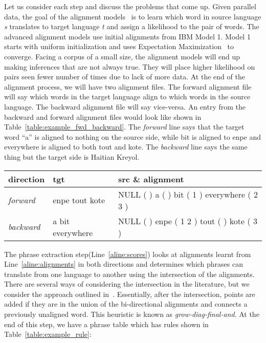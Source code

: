 Let us consider each step and discuss the problems that come up. Given parallel data, the goal of the alignment models~\cite{Brown:1993,Vogel:1996} is to learn which word in source language \emph{s} translates to target language \emph{t} and assign a likelihood to the pair of words. The advanced alignment models use initial alignments from IBM Model 1. Model 1 starts with uniform initialization and uses Expectation Maximization~\cite{Dempster:77} to converge. Facing a corpus of a small size, the alignment models will end up making inferences that are not always true. They will place higher likelihood on pairs seen fewer number of times due to lack of more data. At the end of the alignment process, we will have two alignment files. The forward alignment file will say which words in the target language align to which words in the source language. The backward alignment file will say vice-versa. An entry from the backward and forward alignment files would look like shown in Table~\ref{table:example_fwd_backward}. The \emph{forward} line says that the target word ``a'' is aligned to nothing on the source side, while bit is aligned to enpe and everywhere is aligned to both tout and kote. The \emph{backward} line says the same thing but the target side is Haitian Kreyol. 

\begin{table*}
\small
\small
\begin{tabular}{lp{}p{}}
\toprule
direction & tgt & src \& alignment \\
\toprule
\emph{forward} & enpe tout kote & NULL ({ }) a ({ }) bit ({ 1 }) everywhere ({ 2 3 })  \\
\emph{backward} & a bit everywhere & NULL ({ }) enpe ({ 1 2 }) tout ({ }) kote ({ 3 }) \\
\bottomrule
\end{tabular}
\caption{Example of a forward and backward alignment}
\label{table:example_fwd_backward}
\end{table*}


The phrase extraction step(Line~\ref{aline:scores}) looks at alignments learnt from Line~\ref{aline:alignments} in both directions and determines which phrases can translate from one language to another using the intersection of the alignments. There are several ways of considering the intersection in the literature, but we consider the approach outlined in~\cite{Koehn:03}. Essentially, after the intersection, points are added if they are in the union of the bi-directional alignments and connects a previously unaligned word. This heuristic is known as \emph{grow-diag-final-and}. At the end of this step, we have a phrase table which has rules shown in Table~\ref{table:example_rule}: 

